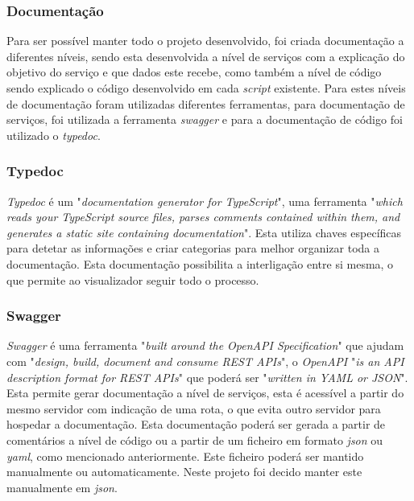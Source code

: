 \subsubsection{Documentação}
Para ser possível manter todo o projeto desenvolvido, foi criada documentação a diferentes níveis, sendo esta desenvolvida a nível de serviços com a explicação do objetivo do serviço e que dados este recebe, como também a nível de código sendo explicado o código desenvolvido em cada \textit{script} existente. Para estes níveis de documentação foram utilizadas diferentes ferramentas, para documentação de serviços, foi utilizada a ferramenta \textit{swagger} e para a documentação de código foi utilizado o \textit{typedoc}.

\subsubsection{Typedoc}

\textit{Typedoc} é um "\emph{documentation generator for TypeScript}"\citep{typedoc}, uma ferramenta "\emph{which reads your TypeScript source files, parses comments contained within them, and generates a static site containing documentation}"\citep{typedoc}. Esta utiliza chaves específicas para detetar as informações e criar categorias para melhor organizar toda a documentação. Esta documentação possibilita a interligação entre si mesma, o que permite ao visualizador seguir todo o processo.

\newpage

\subsubsection{Swagger}

\textit{Swagger} é uma ferramenta "\emph{built around the OpenAPI Specification}"\citep{swagger} que ajudam com "\emph{design, build, document and consume REST APIs}"\citep{swagger}, o \emph{OpenAPI} "\emph{is an API description format for REST APIs}"\citep{swagger} que poderá ser "\emph{written in YAML or JSON}"\citep{swagger}. Esta permite gerar documentação a nível de serviços, esta é acessível a partir do mesmo servidor com indicação de uma rota, o que evita outro servidor para hospedar a documentação. Esta documentação poderá ser gerada a partir de comentários a nível de código ou a partir de um ficheiro em formato \textit{json} ou \textit{yaml}, como mencionado anteriormente. Este ficheiro poderá ser mantido manualmente ou automaticamente. Neste projeto foi decido manter este manualmente em \emph{json}.